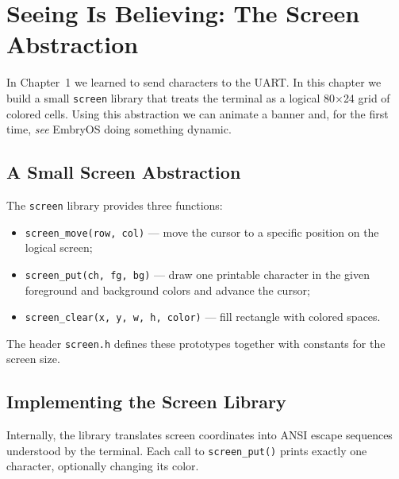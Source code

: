 \chapter{Seeing Is Believing: The Screen Abstraction}

In Chapter~1 we learned to send characters to the UART.  In this chapter we
build a small \texttt{screen} library that treats the terminal as a logical
80$\times$24 grid of colored cells.  Using this abstraction we can animate a
banner and, for the first time, \emph{see} EmbryOS doing something dynamic.

\section{A Small Screen Abstraction}

The \texttt{screen} library provides three functions:
\begin{itemize}
  \item \texttt{screen\_move(row, col)} --- move the cursor to a specific
        position on the logical screen;
  \item \texttt{screen\_put(ch, fg, bg)} --- draw one printable character in the
        given foreground and background colors and advance the cursor;
  \item \texttt{screen\_clear(x, y, w, h, color)} --- fill rectangle with colored spaces.
\end{itemize}
The header \texttt{screen.h} defines these prototypes together with constants
for the screen size.

\begin{figure}[H]
\centering
\begin{minipage}{0.7\textwidth}

\end{minipage}
\end{figure}

\section{Implementing the Screen Library}

Internally, the library translates screen coordinates into ANSI escape sequences
understood by the terminal.  Each call to \texttt{screen\_put()} prints exactly
one character, optionally changing its color.

\begin{figure}[H]
\centering
\begin{minipage}{0.9\textwidth}

\end{minipage}
\end{figure}

